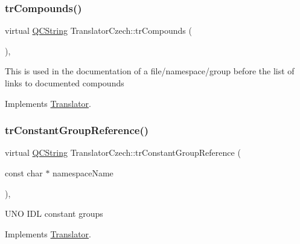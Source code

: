 \mbox{\label{class_translator_czech_a638000ab0a52beab29a7346163d992c0}} 
\subsubsection{\texorpdfstring{trCompounds()}{trCompounds()}}
{\footnotesize\ttfamily virtual \mbox{\hyperlink{class_q_c_string}{Q\+C\+String}} Translator\+Czech\+::tr\+Compounds (\begin{DoxyParamCaption}{ }\end{DoxyParamCaption})\hspace{0.3cm}{\ttfamily [inline]}, {\ttfamily [virtual]}}

This is used in the documentation of a file/namespace/group before the list of links to documented compounds 

Implements \mbox{\hyperlink{class_translator}{Translator}}.

\mbox{\label{class_translator_czech_a98f04e9b3a3abd710fd36bd280ee2882}} 
\subsubsection{\texorpdfstring{trConstantGroupReference()}{trConstantGroupReference()}}
{\footnotesize\ttfamily virtual \mbox{\hyperlink{class_q_c_string}{Q\+C\+String}} Translator\+Czech\+::tr\+Constant\+Group\+Reference (\begin{DoxyParamCaption}\item[{const char $\ast$}]{namespace\+Name }\end{DoxyParamCaption})\hspace{0.3cm}{\ttfamily [inline]}, {\ttfamily [virtual]}}

U\+NO I\+DL constant groups 

Implements \mbox{\hyperlink{class_translator}{Translator}}.

\mbox{\label{class_translator_czech_a2867d4779cd8a9c86eb592ea8373063c}} 
